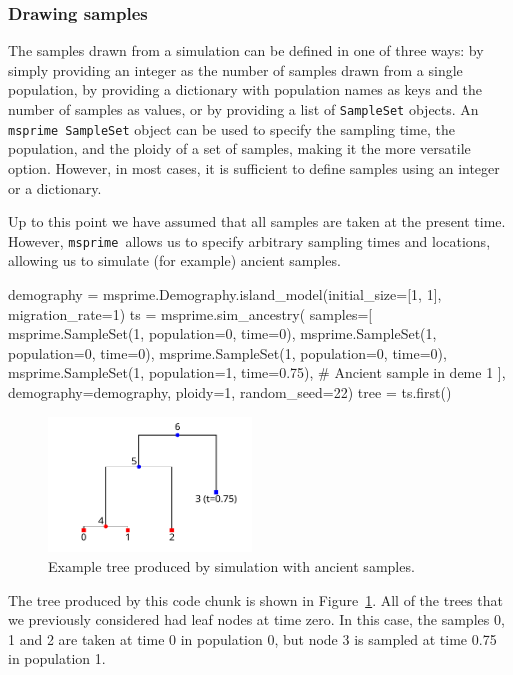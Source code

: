 \documentclass[graybox]{svmult}
\newcommand{\msprime}[0]{\texttt{msprime}}
\begin{document}
\subsubsection{Drawing samples}\label{ancient-samples}

The samples drawn from a simulation can be defined in one of three ways: by
simply providing an integer as the number of samples drawn from a single population,
by providing a dictionary with population names as keys and the number of
samples as values, or by providing a list of \texttt{SampleSet} objects.
An \msprime\ \texttt{SampleSet} object can be used to specify the sampling
time, the population, and the ploidy of a set of samples, making it the more
versatile option. However, in most cases, it is sufficient to define samples
using an integer or a dictionary.

Up to this point we have assumed that all samples are taken at the
present time. However, \msprime\ allows us to specify arbitrary sampling
times and locations, allowing us to simulate (for example) ancient
samples.

\begin{pythoncode}
demography = msprime.Demography.island_model(initial_size=[1, 1],
    migration_rate=1)
ts = msprime.sim_ancestry(
    samples=[
        msprime.SampleSet(1, population=0, time=0),
        msprime.SampleSet(1, population=0, time=0),
        msprime.SampleSet(1, population=0, time=0),
        msprime.SampleSet(1, population=1, time=0.75),
        # Ancient sample in deme 1
    ],
    demography=demography, ploidy=1, random_seed=22)
tree = ts.first()
\end{pythoncode}

\begin{figure}[t]
\centering
\includegraphics[width=0.48\textwidth]{images/plot_9.pdf}
\caption{\label{fig-tree-ancient-samples} Example tree produced by simulation
with ancient samples.}
\end{figure}

The tree produced by this code chunk is shown in Figure~\ref{fig-tree-ancient-samples}.
All of the trees that we previously considered had leaf nodes at time
zero. In this case, the samples 0, 1 and 2 are taken at time 0 in
population 0, but node 3 is sampled at time 0.75 in population 1.
\end{document}
